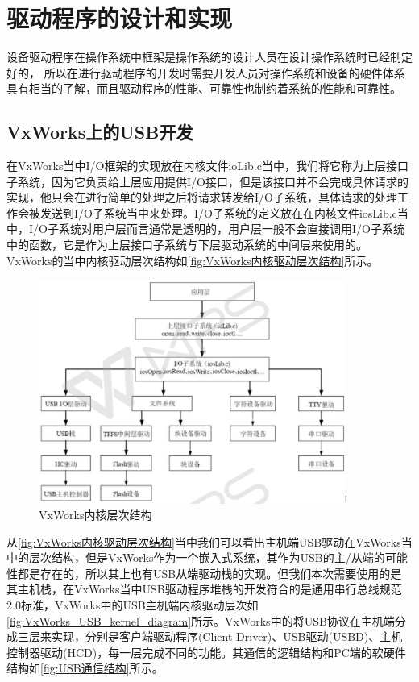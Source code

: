 \chapter{驱动程序的设计和实现}
	
	设备驱动程序在操作系统中框架是操作系统的设计人员在设计操作系统时已经制定好的，	所以在进行驱动程序的开发时需要开发人员对操作系统和设备的硬件体系具有相当的了解，而且驱动程序的性能、可靠性也制约着系统的性能和可靠性。	


\section{VxWorks上的USB开发}\label{sec:USB开发}
	在VxWorks当中I/O框架的实现放在内核文件ioLib.c当中，我们将它称为上层接口子系统，因为它负责给上层应用提供I/O接口，但是该接口并不会完成具体请求的实现，他只会在进行简单的处理之后将请求转发给I/O子系统，具体请求的处理工作会被发送到I/O子系统当中来处理。I/O子系统的定义放在在内核文件iosLib.c当中，I/O子系统对用户层而言通常是透明的，用户层一般不会直接调用I/O子系统中的函数，它是作为上层接口子系统与下层驱动系统的中间层来使用的。VxWorks的当中内核驱动层次结构如\autoref{fig:VxWorks内核驱动层次结构}所示。	

\begin{figure}[!h]
\centering
\includegraphics[width=0.9\textwidth]{./graphics/vxworks-kernel-diagram.pdf}
\caption{VxWorks内核层次结构}\label{fig:VxWorks内核驱动层次结构}
\end{figure}	
			
	从\autoref{fig:VxWorks内核驱动层次结构}当中我们可以看出主机端USB驱动在VxWorks当中的层次结构，但是VxWorks作为一个嵌入式系统，其作为USB的主/从端的可能性都是存在的，所以其上也有USB从端驱动栈的实现。但我们本次需要使用的是其主机栈，在VxWorks当中USB驱动程序堆栈的开发符合的是通用串行总线规范2.0标准，VxWorks中的USB主机端内核驱动层次如\autoref{fig:VxWorks_USB_kernel_diagram}所示。VxWorks中的将USB协议在主机端分成三层来实现，分别是客户端驱动程序(Client Driver)、USB驱动(USBD)、主机控制器驱动(HCD)，每一层完成不同的功能。其通信的逻辑结构和PC端的软硬件结构如\autoref{fig:USB通信结构}所示。

